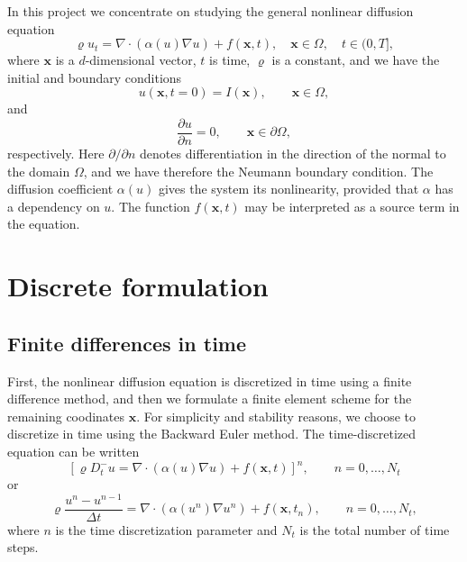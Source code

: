 \documentclass[twoside]{article}
\begin{document}
In this project we concentrate on studying the general nonlinear diffusion equation
\begin{equation}
  \varrho u_{t} = \nabla \cdot \left( \alpha(u)\nabla u\right) + f(\mathbf{x}, t), \quad \mathbf{x} \in \Omega , \quad t \in (0, T] ,
\end{equation}
where $\mathbf{x}$ is a $d$-dimensional vector, $t$ is time, $\varrho $ is a constant, and we have the initial and boundary conditions 
\begin{equation}
  u(\mathbf{x}, t=0) = I(\mathbf{x}), \qquad \mathbf{x} \in \Omega , 
\end{equation}
and
\begin{equation}
  \frac{\partial u}{\partial n} = 0, \qquad \mathbf{x} \in \partial\Omega , 
\end{equation}
respectively. Here $\partial /\partial n$ denotes differentiation in the direction of the normal to the domain $\Omega $, and we have therefore the Neumann boundary condition. The diffusion coefficient $\alpha(u)$ gives the system its nonlinearity, provided that $\alpha $ has a dependency on $u$. The function $f(\mathbf{x}, t)$ may be interpreted as a source term in the equation. 



\section{Discrete formulation}
\label{Scheme}

\subsection{Finite differences in time}
First, the nonlinear diffusion equation is discretized in time using a finite difference method, and then we formulate a finite element scheme for the remaining coodinates $\mathbf{x}$. For simplicity and stability reasons, we choose to discretize in time using the Backward Euler method. The time-discretized equation can be written
\begin{equation}
  \left[ \varrho D_{t}^{-}u = \nabla \cdot \left( \alpha(u)\nabla u\right) + f(\mathbf{x}, t) \right]^{n}, \qquad n = 0, \dots , N_{t} 
\end{equation}
or
\begin{equation}
  \varrho \frac{u^{n} - u^{n-1}}{\Delta t} = \nabla \cdot \left( \alpha(u^{n})\nabla u^{n} \right) + f(\mathbf{x}, t_{n}), \qquad n = 0, \dots , N_{t},
\end{equation}
where $n$ is the time discretization parameter and $N_{t}$ is the total number of time steps.
\end{document}
